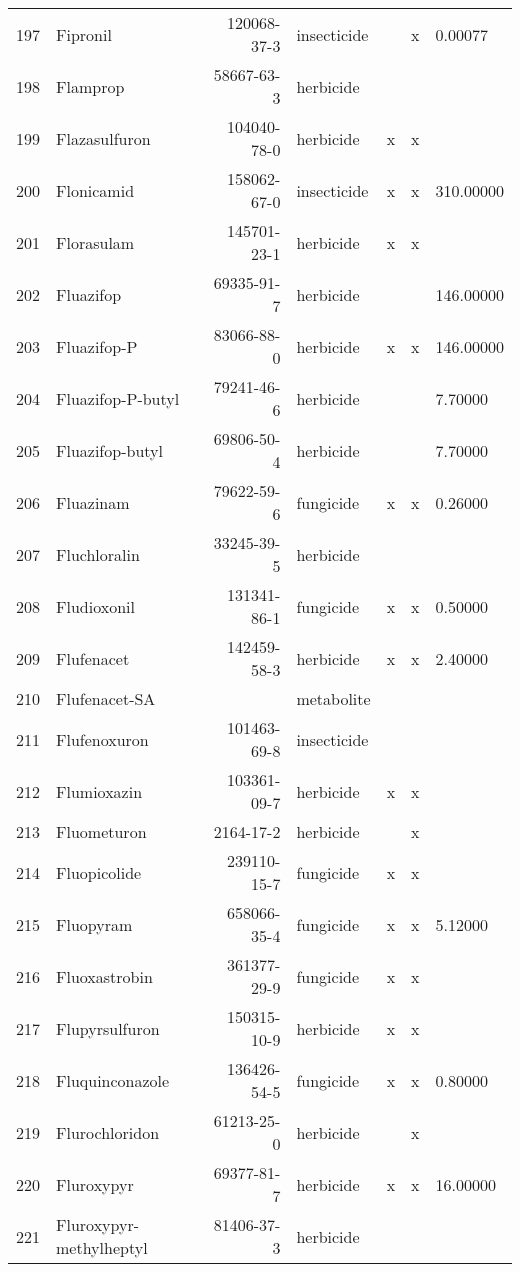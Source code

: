 \begin{longtable}{lp{3cm}rlp{1cm}p{1cm}p{1.5cm}}
  197 & Fipronil & 120068-37-3 & insecticide &  & x & 0.00077 \\ 
  198 & Flamprop & 58667-63-3 & herbicide &  &  &  \\ 
  199 & Flazasulfuron & 104040-78-0 & herbicide & x & x &  \\ 
  200 & Flonicamid & 158062-67-0 & insecticide & x & x & 310.00000 \\ 
  201 & Florasulam & 145701-23-1 & herbicide & x & x &  \\ 
  202 & Fluazifop & 69335-91-7 & herbicide &  &  & 146.00000 \\ 
  203 & Fluazifop-P & 83066-88-0 & herbicide & x & x & 146.00000 \\ 
  204 & Fluazifop-P-butyl & 79241-46-6 & herbicide &  &  & 7.70000 \\ 
  205 & Fluazifop-butyl & 69806-50-4 & herbicide &  &  & 7.70000 \\ 
  206 & Fluazinam & 79622-59-6 & fungicide & x & x & 0.26000 \\ 
  207 & Fluchloralin & 33245-39-5 & herbicide &  &  &  \\ 
  208 & Fludioxonil & 131341-86-1 & fungicide & x & x & 0.50000 \\ 
  209 & Flufenacet & 142459-58-3 & herbicide & x & x & 2.40000 \\ 
  210 & Flufenacet-SA &  & metabolite &  &  &  \\ 
  211 & Flufenoxuron & 101463-69-8 & insecticide &  &  &  \\ 
  212 & Flumioxazin & 103361-09-7 & herbicide & x & x &  \\ 
  213 & Fluometuron & 2164-17-2 & herbicide &  & x &  \\ 
  214 & Fluopicolide & 239110-15-7 & fungicide & x & x &  \\ 
  215 & Fluopyram & 658066-35-4 & fungicide & x & x & 5.12000 \\ 
  216 & Fluoxastrobin & 361377-29-9 & fungicide & x & x &  \\ 
  217 & Flupyrsulfuron & 150315-10-9 & herbicide & x & x &  \\ 
  218 & Fluquinconazole & 136426-54-5 & fungicide & x & x & 0.80000 \\ 
  219 & Flurochloridon & 61213-25-0 & herbicide &  & x &  \\ 
  220 & Fluroxypyr & 69377-81-7 & herbicide & x & x & 16.00000 \\ 
  221 & Fluroxypyr-methylheptyl & 81406-37-3 & herbicide &  &  &  \\ 

\end{longtable}
